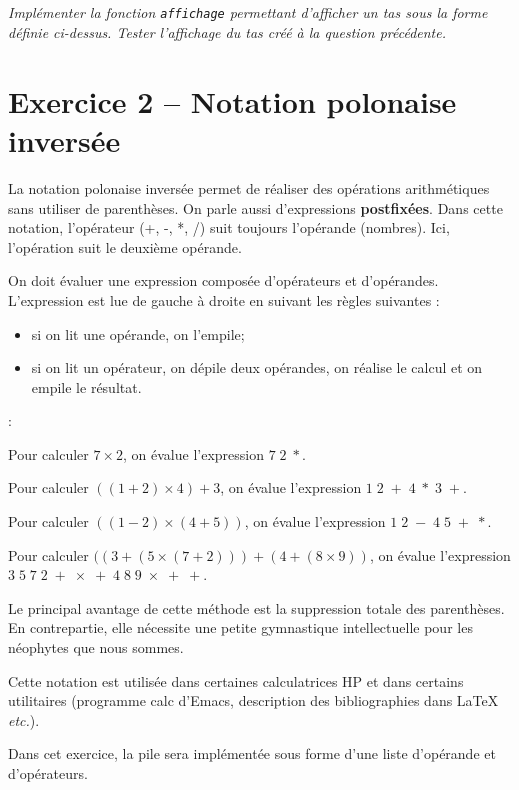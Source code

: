 \documentclass[10pt,fleqn]{article} %
\begin{document}
\begin{multicols}{2}
\subparagraph{}
\textit{Implémenter la fonction \texttt{affichage} permettant d'afficher un tas sous la forme définie ci-dessus. Tester l'affichage du tas créé à la question précédente.}

\section*{Exercice 2 -- Notation polonaise inversée}
\setcounter{exo}{0}
La notation polonaise inversée permet de réaliser des opérations arithmétiques sans utiliser de parenthèses. On parle aussi d'expressions \textbf{postfixées}. Dans cette notation, l'opérateur (+, -, *, /) suit toujours l'opérande (nombres). Ici, l'opération suit le deuxième opérande.

On doit évaluer une expression composée d'opérateurs et d'opérandes. L'expression est lue de gauche à droite en suivant les règles suivantes :
\begin{itemize}
\item si on lit une opérande, on l'empile;
\item si on lit un opérateur, on dépile deux opérandes, on réalise le calcul et on empile le résultat. 
\end{itemize}
\begin{exemple}:

Pour calculer $7\times 2$, on évalue l'expression $7\;2\; *$.

Pour calculer $((1 + 2) \times 4) + 3$, on évalue l'expression $1\;2\;+\;4\;*\;3\;+$.

Pour calculer $((1 - 2) \times (4 + 5))$, on évalue l'expression $1\;2\;-\;4\;5\;+\;*$.

Pour calculer $((3 + (5\times (7 + 2))) + (4 + (8 \times 9))$, on évalue l'expression $3\;5\;7\;2\;+\;\times\;+\;4\;8\;9\;\times\;+\;+$.
\end{exemple} 


\begin{rem}
Le principal avantage de cette méthode est la suppression totale des parenthèses. En contrepartie, elle nécessite une petite gymnastique intellectuelle pour les néophytes que nous sommes.

Cette notation est utilisée dans certaines calculatrices HP et dans certains utilitaires (programme calc d'Emacs, description des bibliographies dans LaTeX \textit{etc.}).
\end{rem}

Dans cet exercice, la pile sera implémentée sous forme d'une liste d'opérande et d'opérateurs.


\end{multicols}
\end{document}
